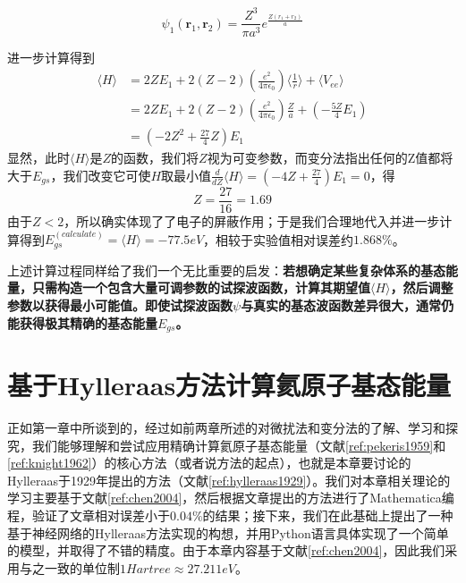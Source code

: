 \begin{equation}\label{eq3}
	\psi_1 (\textbf{r}_1, \textbf{r}_2)
	=\frac{Z^3}{\pi a^3} e^{\frac{Z(r_1+r_2)}{a}}
\end{equation}

进一步计算得到	
\begin{equation*}
	\begin{split}
		\langle H \rangle &= 2ZE_1 + 2(Z - 2)(\frac{e^2}{4 \pi \epsilon_0}) \langle \frac{1}{r} \rangle +\langle V_{ee} \rangle\\
		&=2ZE_1 + 2(Z - 2)(\frac{e^2}{4 \pi \epsilon_0}) \frac{Z}{a} +(- \frac{5Z}{4}E_1)\\
		&=(-2Z^2 +\frac{27}{4}Z)E_1
	\end{split}
\end{equation*}
显然，此时$\langle H \rangle$是$Z$的函数，我们将$Z$视为可变参数，而变分法指出任何的Z值都将大于$E_{gs}$，我们改变它可使$H$取最小值$\frac{d}{dZ} \langle H \rangle=( -4Z+\frac{27}{4})E_1=0$，得
\begin{equation}\label{eq4}
	Z=\frac{27}{16}=1.69
\end{equation}
由于$Z<2$，所以确实体现了了电子的屏蔽作用；于是我们合理地代入并进一步计算得到$E^{(calculate)}_{gs}=\langle H \rangle=-77.5eV$，相较于实验值相对误差约$1.868\%$。

上述计算过程同样给了我们一个无比重要的启发：\textbf{若想确定某些复杂体系的基态能量，只需构造一个包含\textbf{大量可调参数}的试探波函数，计算其期望值$\langle H \rangle$，然后调整参数以获得最小可能值。即使试探波函数$\psi$与真实的基态波函数差异很大，通常仍能获得极其精确的基态能量$E_{gs}$。}

\section{基于Hylleraas方法计算氦原子基态能量}
正如第一章中所谈到的，经过如前两章所述的对微扰法和变分法的了解、学习和探究，我们能够理解和尝试应用精确计算氦原子基态能量（文献\cref{ref:pekeris1959}和\cref{ref:knight1962}）的核心方法（或者说方法的起点），也就是本章要讨论的Hylleraas于1929年提出的方法（文献\cref{ref:hylleraas1929}）。我们对本章相关理论的学习主要基于文献\cref{ref:chen2004}，然后根据文章提出的方法进行了Mathematica编程，验证了文章相对误差小于$0.04\%$的结果；接下来，我们在此基础上提出了一种基于神经网络的Hylleraas方法实现的构想，并用Python语言具体实现了一个简单的模型，并取得了不错的精度。由于本章内容基于文献\cref{ref:chen2004}，因此我们采用与之一致的单位制$1 Hartree\approx27.211 eV$。

